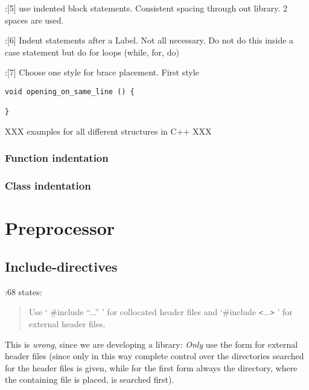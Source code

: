 \documentclass{book}
\begin{document}
\cite{OKL_MisfeldtBumgardnerGray2004CppStyle}:[5] use indented block statements. Consistent spacing through out library. 2 spaces are used.

\cite{OKL_MisfeldtBumgardnerGray2004CppStyle}:[6] Indent statements after a Label. Not all necessary. Do not do this inside a case statement but do for loops (while, for, do)

\cite{OKL_MisfeldtBumgardnerGray2004CppStyle}:[7] Choose one style for brace placement. First style

\begin{verbatim}
void opening_on_same_line () {

}                                          
\end{verbatim}

XXX examples for all different structures in C++ XXX


\subsection{Function indentation}
\label{subsec:FuncIndentation}

\subsection{Class indentation}
\label{subsec:ClassIndentation}






\chapter{Preprocessor}
\label{cha:Preprocessor}

\section{Include-directives}
\label{sec:PreprocessorInclude}

\cite{OKL_MisfeldtBumgardnerGray2004CppStyle}:68 states:
\begin{quote}
  Use ` {\#}include ``...'' ' for collocated header files and `{\#}include \texttt{<}...\texttt{>} ' for external header files.
\end{quote}
This is \emph{wrong}, since we are developing a library: \emph{Only} use the form for external header files (since only in this way complete control over the directories searched for the header files is given, while for the first form always the directory, where the containing file is placed, is searched first).
\end{document}
